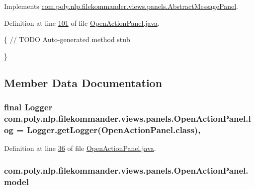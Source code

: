 Implements \hyperlink{classcom_1_1poly_1_1nlp_1_1filekommander_1_1views_1_1panels_1_1_abstract_message_panel_a305ad7e0b41448b92cfc567062fbb874}{com.\-poly.\-nlp.\-filekommander.\-views.\-panels.\-Abstract\-Message\-Panel}.



Definition at line \hyperlink{L101}{101} of file \hyperlink{}{Open\-Action\-Panel.\-java}.


\begin{DoxyCode}
                                             \{
        \textcolor{comment}{// TODO Auto-generated method stub}
        
    \}
\end{DoxyCode}


\subsection{Member Data Documentation}
\hypertarget{classcom_1_1poly_1_1nlp_1_1filekommander_1_1views_1_1panels_1_1_open_action_panel_ae294b0a7ffcc9883269b1392750065b5}{
\subsubsection[{log}]{\setlength{\rightskip}{0pt plus 5cm}final Logger com.\-poly.\-nlp.\-filekommander.\-views.\-panels.\-Open\-Action\-Panel.\-log = Logger.\-get\-Logger(Open\-Action\-Panel.\-class)\hspace{0.3cm}{\ttfamily [static]}, {\ttfamily [private]}}}\label{classcom_1_1poly_1_1nlp_1_1filekommander_1_1views_1_1panels_1_1_open_action_panel_ae294b0a7ffcc9883269b1392750065b5}


Definition at line \hyperlink{L36}{36} of file \hyperlink{}{Open\-Action\-Panel.\-java}.

\hypertarget{classcom_1_1poly_1_1nlp_1_1filekommander_1_1views_1_1panels_1_1_open_action_panel_aba846378e4e1fd54f49642dcf88cb3d6}{
\subsubsection[{model}]{ com.\-poly.\-nlp.\-filekommander.\-views.\-panels.\-Open\-Action\-Panel.\-model\hspace{0.3cm}{\ttfamily [private]}}}\label{classcom_1_1poly_1_1nlp_1_1filekommander_1_1views_1_1panels_1_1_open_action_panel_aba846378e4e1fd54f49642dcf88cb3d6}


